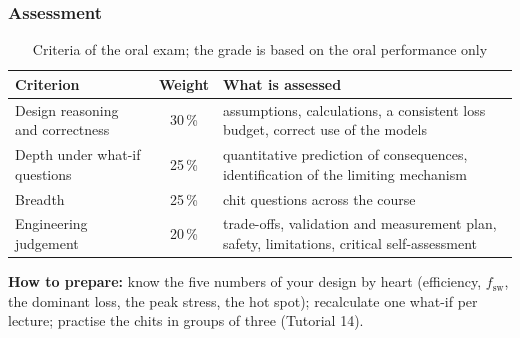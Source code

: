 \begin{frame}
	\frametitle{Assessment}
	\begin{table}
		\centering
		\footnotesize
		\begin{tabular}{|l|c|>{\raggedright\arraybackslash}p{7.6cm}|}
			\hline
			\textbf{Criterion}               & \textbf{Weight} & \textbf{What is assessed}                                                                     \\
			\hline
			Design reasoning and correctness & 30\,\%          & assumptions, calculations, a consistent loss budget, correct use of the models                \\
			Depth under what-if questions    & 25\,\%          & quantitative prediction of consequences, identification of the limiting mechanism             \\
			Breadth                          & 25\,\%          & chit questions across the course                                                              \\
			Engineering judgement            & 20\,\%          & trade-offs, validation and measurement plan, safety, limitations, critical self-assessment    \\
			\hline
		\end{tabular}
		\caption{Criteria of the oral exam; the grade is based on the oral performance only}
	\end{table}
	\small
	\textbf{How to prepare:} know the five numbers of your design by heart (efficiency, $f_\mathrm{sw}$, the dominant loss, the peak stress, the hot spot); recalculate one what-if per lecture; practise the chits in groups of three (Tutorial 14).
\end{frame}

